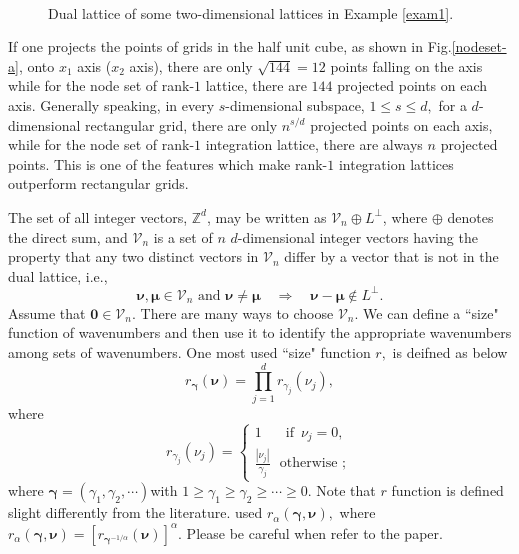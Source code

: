\documentclass[article]{siamltex}
\def\bmu{{\boldsymbol \mu }}
\def\bnu{{\boldsymbol \nu }}
\def\bgam{{\boldsymbol \gamma }}
\def\bzero{{\boldsymbol 0}}
\def\calV {\mathcal {V}}
\newcommand{\Z}{{\mathbb Z}}
\newcommand{\dprod}{\displaystyle\prod}
\begin{document}
\begin{figure}
\centering
{}\\
 \caption{Dual lattice of  some two-dimensional lattices in Example \ref{exam1}.} \label{duallattice}
\end{figure}

If one projects the points of grids in the half unit cube, as
shown in Fig.\ref{nodeset-a}, onto $x_1$ axis ($x_2$ axis), there
are only $\sqrt{144}=12$ points falling on the axis while for the
node set of rank-$1$ lattice, there are $144$ projected points on
each axis. Generally speaking, in every $s$-dimensional subspace,
$1\leq s\leq d,$ for a $d$-dimensional rectangular grid, there are
only $n^{s/d}$ projected points on each axis, while for the node
set of rank-$1$ integration lattice, there are always $n$
projected points. This is one of the features which make rank-$1$
integration lattices outperform rectangular grids.

The set of all integer vectors, ${\Z}^d$, may be written as
${\calV}_n\oplus L^\bot$, where $\oplus$ denotes the direct sum,
and ${\calV}_n$ is a set of $n$ $d$-dimensional integer vectors
having the property that any two distinct vectors in ${\calV}_n$
differ by a vector that is not in the dual lattice, i.e.,
\begin{equation}                                 \label{calV-condition-1}
\bnu,\bmu\in{\calV}_n \text{ and } \bnu\neq\bmu
 \quad\Rightarrow \quad \bnu-\bmu\notin L^\bot.
\end{equation}
Assume that $\bzero\in{\calV}_n.$ There are many ways to choose
${\calV}_n.$  We can define a ``size" function of  wavenumbers and then use it to identify the appropriate wavenumbers among sets of wavenumbers. One most used   ``size"  function $r,$ is deifned as below
\begin{equation}\label{r}r_\bgam(\bnu)=\dprod_{j=1}^d
r_{\gamma_j}(\nu_j),\end{equation}
 where $$r_{\gamma_j}(\nu_j) =
 \left\{\begin{array}{l}
1 \ \ \ \ \ \ \ \,\mbox{if } \,\nu_j=0, \\
\frac{|\nu_j|}{\gamma_j} \ \ \ \mbox{otherwise };
\end{array}\right. $$
where ${\boldsymbol \gamma}=(\gamma_1, \gamma_2,\cdots)$with  $
1\ge \gamma_1\ge \gamma_2\ge \cdots\ge 0.$  Note that  $r$
function is defined slight differently from the literature.
\cite{KuoSloWoz05a} used $r_{\alpha}(\bgam,\bnu),$ where
$r_{\alpha}(\bgam,\bnu)=[r_{\bgam^{-1/\alpha}}(\bnu)]^\alpha.$
Please be careful when refer to the paper.
\end{document}
